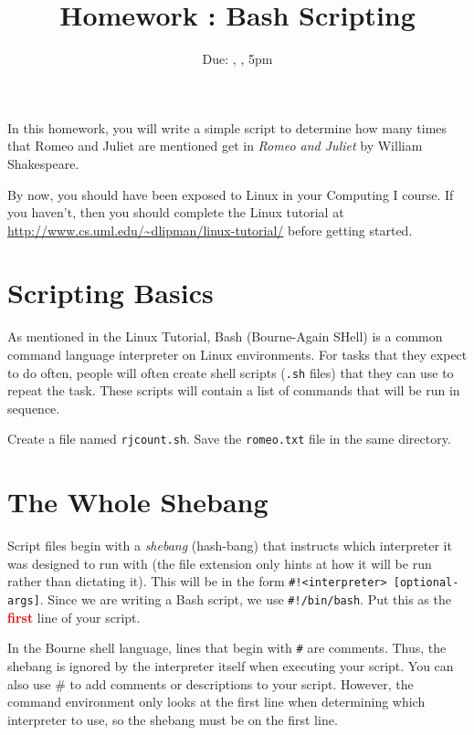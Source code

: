 \documentclass[12pt]{article}
\title{Homework \hwno: Bash Scripting}
\date{Due: \dayofweekname{\duedate}{\duemonth}{\year}, \monthname[\duemonth] \duedate, 5pm}
\newcommand{\code}[1]{\texttt{#1}}
\newcommand{\filename}{\code{rjcount.sh}\xspace}
\begin{document}
\maketitle

In this homework, you will write a simple script to determine how many times that Romeo and Juliet are mentioned get in \emph{Romeo and Juliet} by William Shakespeare.

By now, you should have been exposed to Linux in your Computing I course.  If you haven't, then you should complete the Linux tutorial at \url{http://www.cs.uml.edu/~dlipman/linux-tutorial/} before getting started.



\section*{Scripting Basics}
As mentioned in the Linux Tutorial, Bash (Bourne-Again SHell) is a common command language interpreter on Linux environments.
For tasks that they expect to do often, people will often create shell scripts (\code{.sh} files) that they can use to repeat the task.
These scripts will contain a list of commands that will be run in sequence.

Create a file named \filename.  Save the \code{romeo.txt} file in the same directory.

\section*{The Whole Shebang}

Script files begin with a \emph{shebang} (hash-bang) that instructs which interpreter it was designed to run with (the file extension only hints at how it will be run rather than dictating it).
This will be in the form \code{\#!<interpreter> [optional-args]}.
Since we are writing a Bash script, we use \code{\#!/bin/bash}.
Put this as the \textbf{\textcolor{red}{first}} line of your script.

In the Bourne shell language, lines that begin with \code{\#} are comments.
Thus, the shebang is ignored by the interpreter itself when executing your script.
You can also use \# to add comments or descriptions to your script.
However, the command environment only looks at the first line when determining which interpreter to use, so the shebang must be on the first line.
\end{document}
